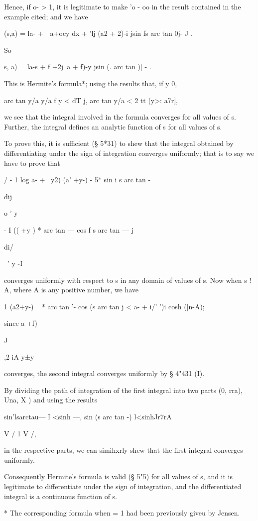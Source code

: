 Hence, if o- > 1, it is legitimate to make 'o - oo in the result
contained in the example cited; and we have

 (s,a) = la- +\ \ a+ocy dx + 'lj (a2 + 2)-i jsin fs arc tan 0j- J .

So

  s, a) = la-s + f +2j\ a + f)-y jsin (. arc tan )| - .

This is Hermite's formula*; using the results that, if y 0,

arc tan y/a y/a f y < dT j, arc tan y/a < 2 tt (y>: a7r],

we see that the integral involved in the formula converges for all
values of s. Further, the integral defines an analytic function of s
for all values of s.

To prove this, it is sufficient (§ 5*31) to shew that the integral
obtained by differentiating under the sign of integration converges
uniformly; that is to say we have to prove that

/ - 1 log a- + \ y2) (a' +y-) - 5* sin i s arc tan -

dij

o ' y

- I (( +y ) * arc tan — cos f s arc tan — j

di/

~' y -I

converges uniformly with respect to s in any domain of values of s.
Now when s ! A, where A is any positive number, we have

1 (a2+y-) ~ * arc tan '- cos (s arc tan j < a- + i/' ')i cosh (|n-A);

since a-+f)

  J

,2 iA y±y\

converges, the second integral converges uniformly by § 4"431 (I).

By dividing the path of integration of the first integral into two
parts (0, rra), Una, X ) and using the results

sin'lsarctau— I <sinh —, sin (s arc tan -) l<sinhJr7rA

V / 1 V /,

in the respective parts, we can simihxrly shew that the first integral
converges uniformly.

Consequently Hermite's formula is valid (§ 5"5) for all values of s,
and it is legitimate to differentiate under the sign of integration,
and the differentiated integral is a continuous function of s.

* The corresponding formula when = 1 had been previously giveu by
Jensen.

